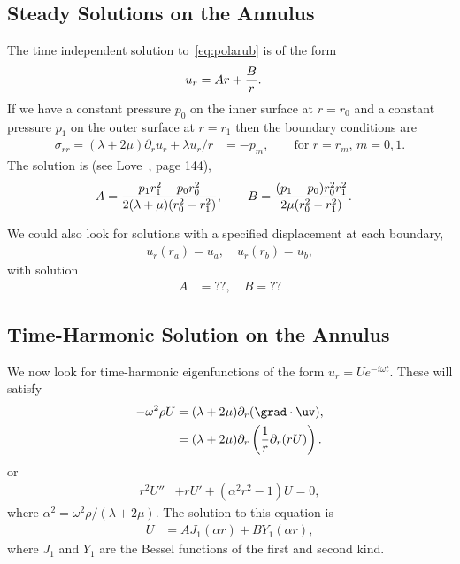 \subsection{Steady Solutions on the Annulus}
The time independent solution to~\eqref{eq:polarub} is of the form
\begin{align*}
  u_r &= A r + {B \over r}. 
\end{align*}
If we have a constant pressure $p_0$ on the inner surface at $r=r_0$ and a constant pressure $p_1$ on the
outer surface at $r=r_1$ then the boundary conditions are 
\begin{align*}
  \sigma_{rr}= (\lambda+2\mu)\partial_r u_r + \lambda u_r/r &= - p_m, \qquad \text{for $r=r_m$, $m=0,1$}. 
\end{align*}
The solution is (see Love~\cite{Love1944}, page 144),
\begin{align*}
  A &= { p_1 r_1^2 - p_0 r_0^2 \over 2(\lambda+\mu)(r_0^2-r_1^2)}, \qquad
         B = { (p_1-p_0)r_0^2 r_1^2 \over 2\mu(r_0^2-r_1^2)} . 
\end{align*}

We could also look for solutions with a specified displacement at each boundary, 
\begin{align*}
   u_r(r_a) = u_a, \quad u_r(r_b)=u_b, 
\end{align*}
with solution
\begin{align*}
  A &= ?? , \quad B= ?? 
\end{align*}

\subsection{Time-Harmonic Solution on the Annulus}

We now look for time-harmonic eigenfunctions of the form $u_r = U e^{-i\omega t}$. These 
will satisfy 
\begin{align}
 -\omega^2 \rho U &= (\lambda+2\mu)\partial_r(\grad\cdot\uv),  \\
            &= (\lambda+2\mu)\partial_r\left( {1\over r} \partial_r( r U) \right) \label{eq:polarut}. 
\end{align}
or 
\begin{align*}
  r^2 U'' &+ r U' + (\alpha^2 r^2  - 1 ) U = 0,
\end{align*}
where $\alpha^2 = \omega^2\rho/(\lambda+2\mu)$. 
The solution to this equation is 
\begin{align*}
   U &= A J_1(\alpha r) + B Y_1(\alpha r), 
\end{align*}
where $J_1$ and $Y_1$ are the Bessel functions of the first and second kind. 

